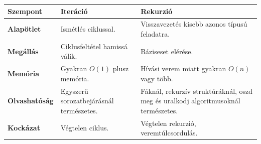 \begin{tabularx}{\textwidth}{>{\bfseries}lXX}
Szempont & Iteráció & Rekurzió \\
\midrule
Alapötlet & Ismétlés ciklussal. & Visszavezetés kisebb azonos típusú feladatra. \\
Megállás & Ciklusfeltétel hamissá válik. & Báziseset elérése. \\
Memória & Gyakran $O(1)$ plusz memória. & Hívási verem miatt gyakran $O(n)$ vagy több. \\
Olvashatóság & Egyszerű sorozatbejárásnál természetes. & Fáknál, rekurzív struktúráknál, oszd meg és uralkodj algoritmusoknál természetes. \\
Kockázat & Végtelen ciklus. & Végtelen rekurzió, veremtúlcsordulás. \\
\end{tabularx}
